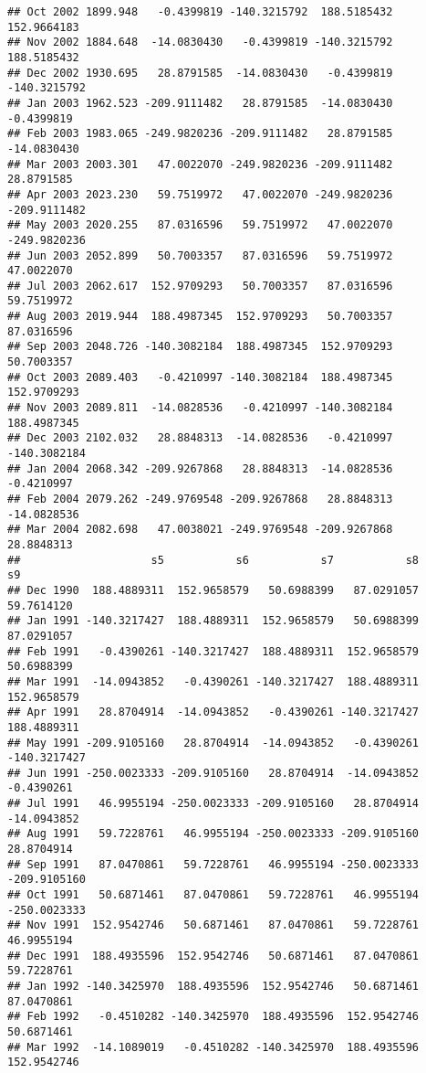 \documentclass[]{article}
\begin{document}
\begin{verbatim}
## Oct 2002 1899.948   -0.4399819 -140.3215792  188.5185432  152.9664183
## Nov 2002 1884.648  -14.0830430   -0.4399819 -140.3215792  188.5185432
## Dec 2002 1930.695   28.8791585  -14.0830430   -0.4399819 -140.3215792
## Jan 2003 1962.523 -209.9111482   28.8791585  -14.0830430   -0.4399819
## Feb 2003 1983.065 -249.9820236 -209.9111482   28.8791585  -14.0830430
## Mar 2003 2003.301   47.0022070 -249.9820236 -209.9111482   28.8791585
## Apr 2003 2023.230   59.7519972   47.0022070 -249.9820236 -209.9111482
## May 2003 2020.255   87.0316596   59.7519972   47.0022070 -249.9820236
## Jun 2003 2052.899   50.7003357   87.0316596   59.7519972   47.0022070
## Jul 2003 2062.617  152.9709293   50.7003357   87.0316596   59.7519972
## Aug 2003 2019.944  188.4987345  152.9709293   50.7003357   87.0316596
## Sep 2003 2048.726 -140.3082184  188.4987345  152.9709293   50.7003357
## Oct 2003 2089.403   -0.4210997 -140.3082184  188.4987345  152.9709293
## Nov 2003 2089.811  -14.0828536   -0.4210997 -140.3082184  188.4987345
## Dec 2003 2102.032   28.8848313  -14.0828536   -0.4210997 -140.3082184
## Jan 2004 2068.342 -209.9267868   28.8848313  -14.0828536   -0.4210997
## Feb 2004 2079.262 -249.9769548 -209.9267868   28.8848313  -14.0828536
## Mar 2004 2082.698   47.0038021 -249.9769548 -209.9267868   28.8848313
##                    s5           s6           s7           s8           s9
## Dec 1990  188.4889311  152.9658579   50.6988399   87.0291057   59.7614120
## Jan 1991 -140.3217427  188.4889311  152.9658579   50.6988399   87.0291057
## Feb 1991   -0.4390261 -140.3217427  188.4889311  152.9658579   50.6988399
## Mar 1991  -14.0943852   -0.4390261 -140.3217427  188.4889311  152.9658579
## Apr 1991   28.8704914  -14.0943852   -0.4390261 -140.3217427  188.4889311
## May 1991 -209.9105160   28.8704914  -14.0943852   -0.4390261 -140.3217427
## Jun 1991 -250.0023333 -209.9105160   28.8704914  -14.0943852   -0.4390261
## Jul 1991   46.9955194 -250.0023333 -209.9105160   28.8704914  -14.0943852
## Aug 1991   59.7228761   46.9955194 -250.0023333 -209.9105160   28.8704914
## Sep 1991   87.0470861   59.7228761   46.9955194 -250.0023333 -209.9105160
## Oct 1991   50.6871461   87.0470861   59.7228761   46.9955194 -250.0023333
## Nov 1991  152.9542746   50.6871461   87.0470861   59.7228761   46.9955194
## Dec 1991  188.4935596  152.9542746   50.6871461   87.0470861   59.7228761
## Jan 1992 -140.3425970  188.4935596  152.9542746   50.6871461   87.0470861
## Feb 1992   -0.4510282 -140.3425970  188.4935596  152.9542746   50.6871461
## Mar 1992  -14.1089019   -0.4510282 -140.3425970  188.4935596  152.9542746

\end{verbatim}
\end{document}
